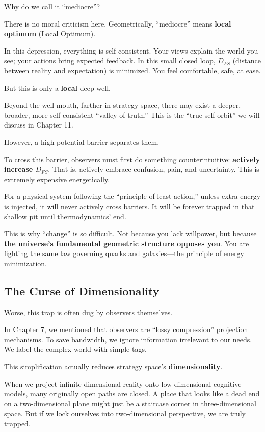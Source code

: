 \documentclass[11pt,a4paper,twoside]{book}
\begin{document}
Why do we call it ``mediocre''?

There is no moral criticism here. Geometrically, ``mediocre'' means \textbf{local optimum} (Local Optimum).

In this depression, everything is self-consistent. Your views explain the world you see; your actions bring expected feedback. In this small closed loop, $D_{FS}$ (distance between reality and expectation) is minimized. You feel comfortable, safe, at ease.

But this is only a \textbf{local} deep well.

Beyond the well mouth, farther in strategy space, there may exist a deeper, broader, more self-consistent ``valley of truth.'' This is the ``true self orbit'' we will discuss in Chapter 11.

However, a high potential barrier separates them.

To cross this barrier, observers must first do something counterintuitive: \textbf{actively increase $D_{FS}$}. That is, actively embrace confusion, pain, and uncertainty. This is extremely expensive energetically.

For a physical system following the ``principle of least action,'' unless extra energy is injected, it will never actively cross barriers. It will be forever trapped in that shallow pit until thermodynamics' end.

This is why ``change'' is so difficult. Not because you lack willpower, but because \textbf{the universe's fundamental geometric structure opposes you}. You are fighting the same law governing quarks and galaxies---the principle of energy minimization.

\subsection{The Curse of Dimensionality}

Worse, this trap is often dug by observers themselves.

In Chapter 7, we mentioned that observers are ``lossy compression'' projection mechanisms. To save bandwidth, we ignore information irrelevant to our needs. We label the complex world with simple tags.

This simplification actually reduces strategy space's \textbf{dimensionality}.

When we project infinite-dimensional reality onto low-dimensional cognitive models, many originally open paths are closed. A place that looks like a dead end on a two-dimensional plane might just be a staircase corner in three-dimensional space. But if we lock ourselves into two-dimensional perspective, we are truly trapped.
\end{document}

